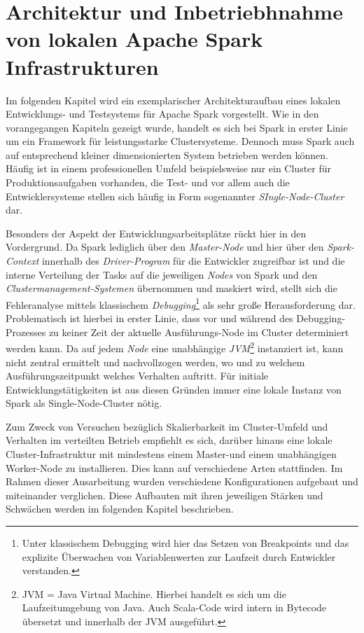 \chapter{Architektur und Inbetriebhnahme von lokalen Apache Spark Infrastrukturen }
\label{chapter:architektur}



Im folgenden Kapitel wird ein exemplarischer Architekturaufbau eines lokalen Entwicklungs- und Testsystems für Apache Spark vorgestellt. Wie in den vorangegangen Kapiteln gezeigt wurde, handelt es sich bei Spark in erster Linie um ein Framework für leistungsstarke Clustersysteme. Dennoch muss Spark auch auf entsprechend kleiner dimensionierten System betrieben werden können. Häufig ist in einem professionellen Umfeld beispielsweise nur ein Cluster für Produktionsaufgaben vorhanden, die Test- und vor allem auch die Entwicklersysteme stellen sich häufig in Form sogenannter \textit{SIngle-Node-Cluster} dar. 

Besonders der Aspekt der Entwicklungsarbeitsplätze rückt hier in den Vordergrund. Da Spark lediglich über den \textit{Master-Node} und hier über den \textit{Spark-Context} innerhalb des \textit{Driver-Program} für die Entwickler zugreifbar ist und die interne Verteilung der Tasks auf die jeweiligen \textit{Nodes} von Spark und den \textit{Clustermanagement-Systemen} übernommen und maskiert wird, stellt sich die Fehleranalyse mittels klassischem \textit{Debugging}\footnote{Unter klassischem Debugging wird hier das Setzen von Breakpoints und das explizite Überwachen von Variablenwerten zur Laufzeit durch Entwickler verstanden.} als sehr große Herausforderung dar. Problematisch ist hierbei in erster Linie, dass vor und während des Debugging-Prozesses zu keiner Zeit der aktuelle Ausführungs-Node im Cluster determiniert werden kann. Da auf jedem \textit{Node} eine unabhängige \textit{JVM}\footnote{JVM = Java Virtual Machine. Hierbei handelt es sich um die Laufzeitumgebung von Java. Auch Scala-Code wird intern in Bytecode übersetzt und innerhalb der JVM ausgeführt.} instanziert ist, kann nicht zentral ermittelt und nachvollzogen werden, wo und zu welchem Ausführungszeitpunkt welches Verhalten auftritt. Für initiale Entwicklungstätigkeiten ist aus diesen Gründen immer eine lokale Instanz von Spark als Single-Node-Cluster nötig.

Zum Zweck von Versuchen bezüglich Skalierbarkeit im Cluster-Umfeld und Verhalten im verteilten Betrieb empfiehlt es sich, darüber hinaus eine lokale Cluster-Infrastruktur mit mindestens einem Master-und einem unabhängigen Worker-Node zu installieren. Dies kann auf verschiedene Arten stattfinden. Im Rahmen dieser Ausarbeitung wurden verschiedene Konfigurationen aufgebaut und miteinander verglichen. Diese Aufbauten mit ihren jeweiligen Stärken und Schwächen werden im folgenden Kapitel beschrieben. 

